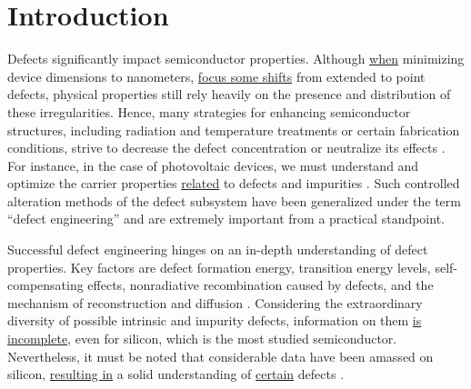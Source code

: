 \documentclass{WileyMSP-template}
\begin{document}


\section{Introduction}

Defects significantly impact semiconductor properties.
Although \textcolor[rgb]{0.00,0.07,1.00}{\uline{when}} minimizing device dimensions to nanometers, \textcolor[rgb]{0.00,0.07,1.00}{\uline{focus some shifts}} from extended to point defects,
physical properties still rely heavily on the presence and distribution of these irregularities.
Hence, many strategies for enhancing semiconductor structures, including radiation and temperature treatments or certain fabrication conditions, strive to decrease the defect concentration or neutralize its effects \cite{Cai2023,Vobecky2021,Frascaroli2021}.
For instance, in the case of photovoltaic devices, we must understand and optimize the carrier properties \textcolor[rgb]{0.00,0.07,1.00}{\uline{related}} to defects and impurities  \cite{Cai2023}.
Such controlled alteration methods of the defect subsystem have been generalized under the term ``defect engineering'' and are extremely important from a practical standpoint.

Successful defect engineering hinges on an in-depth understanding of defect properties.
Key factors are defect formation energy, transition energy levels, self-compensating effects, nonradiative recombination caused by defects,
and the mechanism of reconstruction and diffusion  \cite{Cai2023}.
Considering the extraordinary diversity of possible intrinsic and impurity defects, information on them \textcolor[rgb]{0.00,0.07,1.00}{\uline{is incomplete}},
even for silicon, which is the most studied semiconductor.
Nevertheless, it must be noted that considerable data have been amassed on silicon, \textcolor[rgb]{0.00,0.07,1.00}{\uline{resulting in}} a solid understanding
of \textcolor[rgb]{0.00,0.07,1.00}{\uline{certain}} defects \cite{Juhl2018}.
\end{document}
